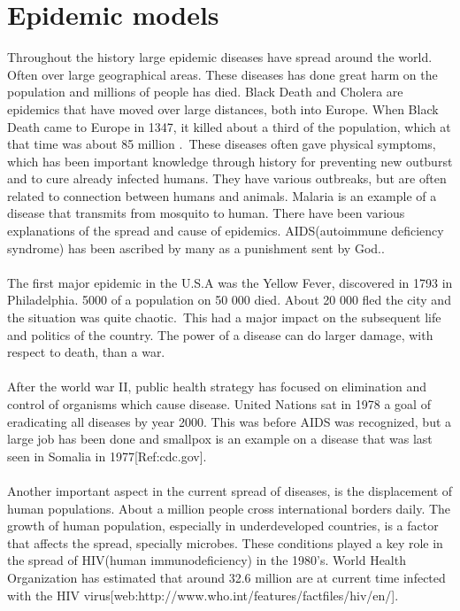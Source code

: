 \documentclass[%
twoside,                 %
final,                   %
10pt]{article}
\begin{document}
\section{Epidemic models}
Throughout the history large epidemic diseases have spread around the world. Often over large geographical areas. These diseases has done great harm on the population and millions of people has died. Black Death and Cholera are epidemics that have moved over large distances, both into Europe. When Black Death came to Europe in 1347, it killed about a third of the population, which at that time was about 85 million \cite[p.~315]{murray2002mathematical}.~These diseases often gave physical symptoms, which has been important knowledge through history for preventing new outburst and to cure already infected humans. They have various outbreaks, but are often related to connection between humans and animals. Malaria is an example of a disease that transmits from mosquito to human. There have been various explanations of the spread and cause of epidemics. AIDS(autoimmune deficiency syndrome) has been ascribed by many as a punishment sent by God.\cite[p.~316]{murray2002mathematical}.~
\\
\\
The first major epidemic in the U.S.A was the Yellow Fever, discovered in 1793 in Philadelphia. 5000 of a population on 50 000 died. About 20 000 fled the city and the situation was quite chaotic\cite[p.~316]{murray2002mathematical}.~This had a major impact on the subsequent life and politics of the country. The power of a disease can do larger damage, with respect to death, than a war.
\\
\\
After the world war II, public health strategy has focused on elimination and control of organisms which cause disease. United Nations sat in 1978 a goal of eradicating all diseases by year 2000. This was before AIDS was recognized, but a large job has been done and smallpox is an example on a disease that was last seen in Somalia in 1977[Ref:cdc.gov].
\\
\\
Another important aspect in the current spread of diseases, is the displacement of human populations. About a million people cross international borders daily. The growth of human population, especially in underdeveloped countries, is a factor that affects the spread, specially microbes. These conditions played a key role in the spread of HIV(human immunodeficiency) in the 1980's. World Health Organization has estimated that around 32.6 million are at current time infected with the HIV virus[web:http://www.who.int/features/factfiles/hiv/en/].
\end{document}

